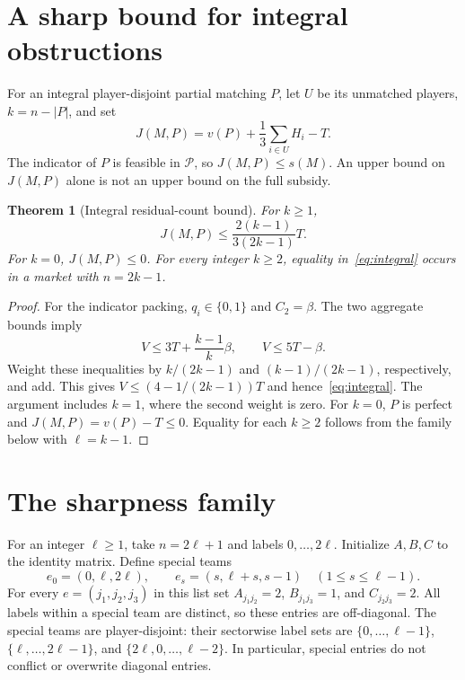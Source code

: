 \documentclass[11pt]{article}
\newtheorem{theorem}{Theorem}[section]
\theoremstyle{remark}
\newcommand{\pack}{\mathcal P}
\begin{document}
\section{A sharp bound for integral obstructions}\label{sec:integral}
For an integral player-disjoint partial matching $P$, let $U$ be its
unmatched players, $k=n-|P|$, and set
\[
              J(M,P)=v(P)+\frac13\sum_{i\in U}H_i-T.
\]
The indicator of $P$ is feasible in $\pack$, so $J(M,P)\le s(M)$.
An upper bound on $J(M,P)$ alone is not an upper bound on the full subsidy.

\begin{theorem}[Integral residual-count bound]\label{thm:integral}
For $k\ge1$,
\begin{equation}\label{eq:integral}
             J(M,P)\le\frac{2(k-1)}{3(2k-1)}T.
\end{equation}
For $k=0$, $J(M,P)\le0$. For every integer $k\ge2$, equality
in~\eqref{eq:integral} occurs in a market with $n=2k-1$.
\end{theorem}
\begin{proof}
For the indicator packing, $q_i\in\{0,1\}$ and $C_2=\beta$. The two
aggregate bounds imply
\[
               V\le3T+\frac{k-1}{k}\beta,\qquad V\le5T-\beta.
\]
Weight these inequalities by $k/(2k-1)$ and $(k-1)/(2k-1)$,
respectively, and add. This gives
$V\le(4-1/(2k-1))T$ and hence~\eqref{eq:integral}.
The argument includes $k=1$, where the second weight is zero.
For $k=0$, $P$ is perfect and $J(M,P)=v(P)-T\le0$.
Equality for each $k\ge2$ follows from the family below with
$\ell=k-1$.
\end{proof}

\section{The sharpness family}\label{sec:family}
For an integer $\ell\ge1$, take $n=2\ell+1$ and labels
$0,\ldots,2\ell$. Initialize $A,B,C$ to the identity matrix. Define
special teams
\begin{equation}\label{eq:family}
 e_0=(0,\ell,2\ell),\qquad
 e_s=(s,\ell+s,s-1)\quad(1\le s\le\ell-1).
\end{equation}
For every $e=(j_1,j_2,j_3)$ in this list set
$A_{j_1j_2}=2$, $B_{j_1j_3}=1$, and $C_{j_2j_3}=2$.
All labels within a special team are distinct, so these entries are
off-diagonal. The special teams are player-disjoint: their sectorwise
label sets are $\{0,\ldots,\ell-1\}$,
$\{\ell,\ldots,2\ell-1\}$, and
$\{2\ell,0,\ldots,\ell-2\}$. In particular, special entries do not
conflict or overwrite diagonal entries.
\end{document}
